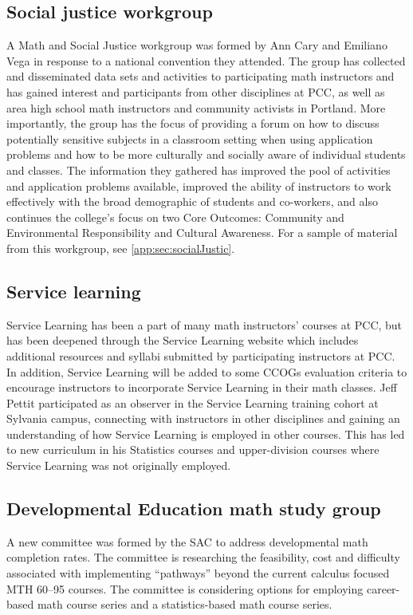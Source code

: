 \subsection{Social justice workgroup}\label{cur:sub:socialJustic}
A Math and Social Justice workgroup was formed by Ann Cary and Emiliano Vega in response to a national convention they attended.
The group has collected and disseminated data sets and activities to participating math instructors and has gained interest and participants from other disciplines at PCC, as well as area high school math instructors and community activists in Portland.
More importantly, the group has the focus of providing a forum on how to discuss potentially sensitive subjects in a classroom setting when using application problems and how to be more culturally and socially aware of individual students and classes.
The information they gathered has improved the pool of activities and application problems available, improved the ability of instructors to work effectively with the broad demographic of students and co-workers, and also continues the college's focus on two Core Outcomes: Community and Environmental Responsibility and Cultural Awareness.
For a sample of material from this workgroup, see \vref{app:sec:socialJustic}.

\subsection{Service learning}\label{other:sec:servicelearning}
Service Learning has been a part of many math instructors' courses at PCC, but has been deepened through the Service Learning website which includes additional resources and syllabi submitted by participating instructors at PCC.
In addition, Service Learning will be added to some CCOGs evaluation criteria to encourage instructors to incorporate Service Learning in their math classes.
Jeff Pettit participated as an observer in the Service Learning training cohort at Sylvania campus, connecting with instructors in other disciplines and gaining an understanding of how Service Learning is employed in other courses.
This has led to new curriculum in his Statistics courses and upper-division courses where Service Learning was not originally employed.

\subsection{Developmental Education math study group}
A new committee was formed by the SAC to address developmental math completion rates.
The committee is researching the feasibility, cost and difficulty associated with implementing ``pathways'' beyond the current calculus focused MTH 60--95 courses.
The committee is considering options for employing career-based math course series and a statistics-based math course series.

